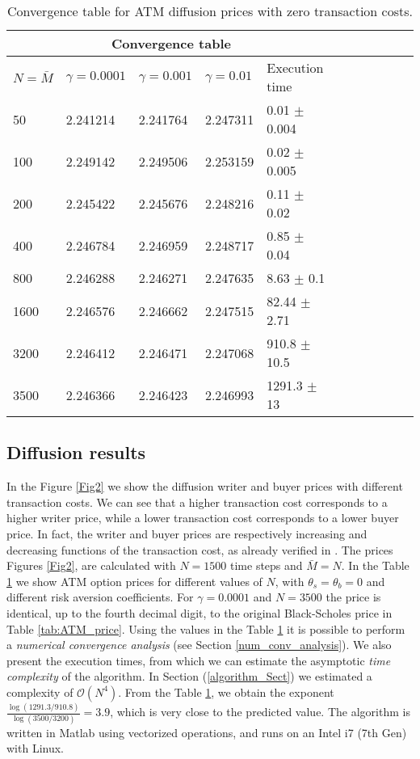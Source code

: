 \begin{table}[ht]
\centering
 \begin{tabular}{*{11}l}
 \toprule
  \multicolumn{5}{c}{\textbf{Convergence table}} \\
  \midrule
  $N = \bar M$ & $\gamma = 0.0001$ & $\gamma = 0.001$ & $\gamma = 0.01$ & Execution time \\
  \midrule
    50   & 2.241214 & 2.241764 & 2.247311 & 0.01 $\pm$ 0.004\\
    100  & 2.249142 & 2.249506 & 2.253159 & 0.02 $\pm$ 0.005\\
    200  & 2.245422 & 2.245676 & 2.248216 & 0.11 $\pm$ 0.02\\
    400  & 2.246784 & 2.246959 & 2.248717 & 0.85 $\pm$ 0.04 \\
    800  & 2.246288 & 2.246271 & 2.247635 & 8.63 $\pm$ 0.1 \\
    1600 & 2.246576 & 2.246662 & 2.247515 & 82.44 $\pm$ 2.71\\
    3200 & 2.246412 & 2.246471 & 2.247068 & 910.8 $\pm$ 10.5\\
    3500 & 2.246366 & 2.246423 & 2.246993 & 1291.3 $\pm$ 13\\
  \bottomrule
  \end{tabular}
  \caption{Convergence table for ATM diffusion prices with zero transaction costs.}
  \label{tab:convergence}
\end{table}

\subsection{Diffusion results}

In the Figure \ref{Fig2} we show the diffusion writer and buyer prices with different
transaction costs.  
We can see that a higher transaction cost corresponds to a higher writer price, while a lower transaction cost corresponds to a lower buyer price.
In fact, the writer and buyer prices are respectively increasing and decreasing functions of the transaction cost, as already verified in \cite{ClHo97}.
The prices Figures \ref{Fig2}, are calculated with $N=1500$ time steps and $\bar M = N$. 
In the Table \ref{tab:convergence} we show ATM option prices for different values of $N$, with $\theta_s = \theta_b = 0$ and different risk aversion coefficients.
For $\gamma=0.0001$ and $N=3500$ the price is identical, up to the fourth decimal digit, to the original Black-Scholes price in Table \ref{tab:ATM_price}. 
Using the values in the Table \ref{tab:convergence} it is possible to perform a \emph{numerical convergence analysis} (see Section \ref{num_conv_analysis}).
We also present the execution times, from which we can estimate the asymptotic \emph{time complexity} of the algorithm. 
In Section (\ref{algorithm_Sect}) we estimated a complexity of $\mathcal{O}(N^{4})$. From the Table \ref{tab:convergence}, 
we obtain the exponent $\frac{\log(1291.3/910.8)}{\log(3500/3200)} = 3.9$, which is very close to the predicted value.  
The algorithm is written in Matlab using vectorized operations, and runs on an Intel i7 (7th Gen) with Linux.

